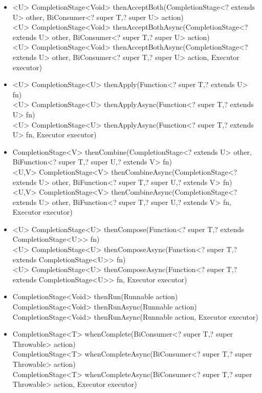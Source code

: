 \documentclass[]{usiinfthesis}
\begin{document}
{\begin{itemize}
    \mbox{}\\ CompletionStage<Void> thenAcceptAsync(Consumer<? super T> action, Executor executor)
    \item   <U> CompletionStage<Void> thenAcceptBoth(CompletionStage<? extends U> other, BiConsumer<? super T,? super U> action)
    \mbox{}\\ <U> CompletionStage<Void> thenAcceptBothAsync(CompletionStage<? extends U> other, BiConsumer<? super T,? super U> action)
    \mbox{}\\ <U> CompletionStage<Void> thenAcceptBothAsync(CompletionStage<? extends U> other, BiConsumer<? super T,? super U> action, Executor executor)
    \item   <U> CompletionStage<U> thenApply(Function<? super T,? extends U> fn)
    \mbox{}\\ <U> CompletionStage<U> thenApplyAsync(Function<? super T,? extends U> fn)
    \mbox{}\\ <U> CompletionStage<U> thenApplyAsync(Function<? super T,? extends U> fn, Executor executor)
    \item   <U,V> CompletionStage<V> thenCombine(CompletionStage<? extends U> other, BiFunction<? super T,? super U,? extends V> fn)
    \mbox{}\\ <U,V> CompletionStage<V> thenCombineAsync(CompletionStage<? extends U> other, BiFunction<? super T,? super U,? extends V> fn)
    \mbox{}\\ <U,V> CompletionStage<V> thenCombineAsync(CompletionStage<? extends U> other, BiFunction<? super T,? super U,? extends V> fn, Executor executor)
    \item   <U> CompletionStage<U> thenCompose(Function<? super T,? extends CompletionStage<U>> fn)
    \mbox{}\\ <U> CompletionStage<U> thenComposeAsync(Function<? super T,? extends CompletionStage<U>> fn)
    \mbox{}\\ <U> CompletionStage<U> thenComposeAsync(Function<? super T,? extends CompletionStage<U>> fn, Executor executor)
    \item   CompletionStage<Void> thenRun(Runnable action)
    \mbox{}\\ CompletionStage<Void> thenRunAsync(Runnable action)
    \mbox{}\\ CompletionStage<Void> thenRunAsync(Runnable action, Executor executor)
    \item   CompletionStage<T> whenComplete(BiConsumer<? super T,? super Throwable> action)
    \mbox{}\\ CompletionStage<T> whenCompleteAsync(BiConsumer<? super T,? super Throwable> action)
    \mbox{}\\ CompletionStage<T> whenCompleteAsync(BiConsumer<? super T,? super Throwable> action, Executor executor)
\end{itemize}}
\end{document}
